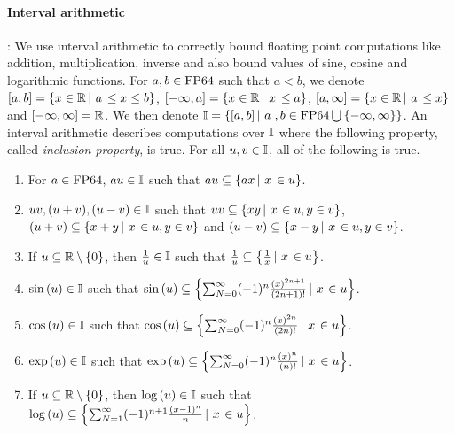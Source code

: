 \paragraph{Interval arithmetic}:  We use interval arithmetic to
correctly bound floating point computations like addition,
multiplication, inverse and also bound values of sine, cosine and
logarithmic functions. For $a,b\in\operatorname{FP64}$ such that $a<b$, we denote\\
$\left[a,b\right] = \left\{x\in\mathbb{R}\left|~a\right.\leq x\leq b\right\}$,
$\left[-\infty,a\right] = \left\{x\in\mathbb{R}\left|~x\right.\leq a\right\}$,
$\left[a,\infty\right] = \left\{x\in\mathbb{R}\left|~a\right.\leq x\right\}$ and
$\left[-\infty,\infty\right] = \mathbb{R}$.  We then denote $\mathbb{I}
= \left\{\left[a,b\right]\left|~a\right.,b\in\operatorname{FP64}\bigcup\left\{-\infty,\infty\right\}\right\}$.
An interval arithmetic describes computations over $\mathbb{I}$ where
the following property, called \emph{inclusion property}, is true.
For all $u,v\in\mathbb{I}$, all of the following is true.
%
\begin{enumerate}
\item For $a\in\operatorname{FP64}$, $au\in\mathbb{I}$ such that $au\subseteq \left\{ax\left|~x\right.\in u\right\}$.
\item $uv,(u+v),(u-v)\in\mathbb{I}$ such that
$uv\subseteq\left\{xy\left|~x\right.\in u, y\in v\right\}$,\\ $\left(u+v\right)\subseteq\left\{x+y\left|~x\right.\in
u, y\in v\right\}$ and $\left(u-v\right)\subseteq\left\{x-y\left|~x\right.\in u, y\in v\right\}$.
\item If $u\subseteq\mathbb{R}\setminus\left\{0\right\}$, then $\frac{1}{u}\in\mathbb{I}$ such that $\frac{1}{u}\subseteq\left\{\frac{1}{x}\left|~x\right.\in u\right\}$.
\item $\sin\left(u\right)\in\mathbb{I}$ such that $\sin\left(u\right)\subseteq\left\{\sum_{N=0}^\infty(-1)^n\frac{\left(x\right)^{2n+1}}{\left(2n+1\right)!}\left|~x\right.\in u\right\}$.
\item $\cos\left(u\right)\in\mathbb{I}$ such that $\cos\left(u\right)\subseteq\left\{\sum_{N=0}^\infty (-1)^n\frac{\left(x\right)^{2n}}{\left(2n\right)!}\left|~x\right.\in u\right\}$.
\item $\exp\left(u\right)\in\mathbb{I}$ such that $\exp\left(u\right)\subseteq\left\{\sum_{N=0}^\infty(-1)^n\frac{\left(x\right)^{n}}{\left(n\right)!}\left|~x\right.\in u\right\}$.
\item If $u\subseteq\mathbb{R}\setminus\left\{0\right\}$, then $\log\left(u\right)\in\mathbb{I}$ such that\\ $\log\left(u\right)\subseteq\left\{\sum_{N=1}^\infty(-1)^{n+1}\frac{\left(x-1\right)^{n}}{n}\left|~x\right.\in u\right\}$.
\end{enumerate}
%

